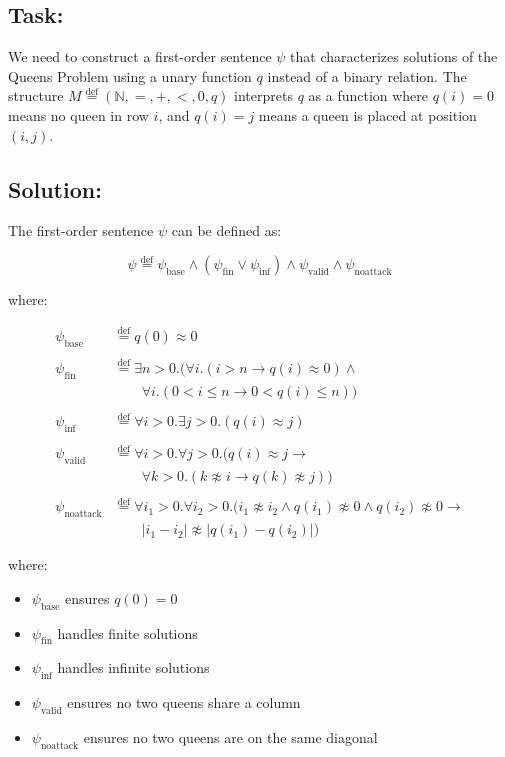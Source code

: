 \documentclass{article}
\newcommand{\defeq}{\stackrel{\text{def}}{=}}
\begin{document}
\subsection*{Task:}
We need to construct a first-order sentence $\psi$ that characterizes solutions of the Queens Problem using a unary function $q$ instead of a binary relation. 
The structure $M \defeq (\mathbb{N}, =, +, <, 0, q)$ interprets $q$ as a function where $q(i) = 0$ means no queen in row $i$, and $q(i) = j$ means a queen is placed at position $(i,j)$.

\subsection*{Solution:}
The first-order sentence $\psi$ can be defined as:

\[ \psi \defeq \psi_{\text{base}} \wedge (\psi_{\text{fin}} \vee \psi_{\text{inf}}) \wedge \psi_{\text{valid}} \wedge \psi_{\text{noattack}} \]

where:

\begin{align*}
\psi_{\text{base}} &\defeq q(0) \approx 0 \\
\\
\psi_{\text{fin}} &\defeq \exists n > 0.(\forall i.(i > n \rightarrow q(i) \approx 0) \wedge \\
    &\qquad \forall i.(0 < i \leq n \rightarrow 0 < q(i) \leq n)) \\
\\
\psi_{\text{inf}} &\defeq \forall i > 0.\exists j > 0.(q(i) \approx j) \\
\\
\psi_{\text{valid}} &\defeq \forall i > 0.\forall j > 0.(q(i) \approx j \rightarrow \\
    &\qquad \forall k > 0.(k \not\approx i \rightarrow q(k) \not\approx j)) \\
\\
\psi_{\text{noattack}} &\defeq \forall i_1 > 0.\forall i_2 > 0.(i_1 \not\approx i_2 \wedge q(i_1) \not\approx 0 \wedge q(i_2) \not\approx 0 \rightarrow \\
    &\qquad |i_1 - i_2| \not\approx |q(i_1) - q(i_2)|)
\end{align*}

where:
\begin{itemize}
\item $\psi_{\text{base}}$ ensures $q(0) = 0$
\item $\psi_{\text{fin}}$ handles finite solutions
\item $\psi_{\text{inf}}$ handles infinite solutions
\item $\psi_{\text{valid}}$ ensures no two queens share a column
\item $\psi_{\text{noattack}}$ ensures no two queens are on the same diagonal
\end{itemize}
\end{document}
